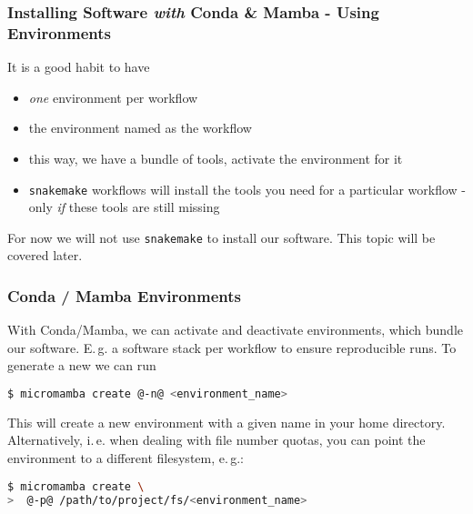 \begin{frame}
  \frametitle{Installing Software \emph{with} Conda \& Mamba - Using Environments}
  \begin{hint}It is a good habit to have
        \begin{itemize}
          \item \emph{one} environment per workflow
          \item the environment named as the workflow
          \item this way, we have a bundle of tools, activate the environment for it
          \item \texttt{snakemake} workflows will install the tools you need for a particular workflow - only \emph{if} these tools are still missing
         \end{itemize}
  \end{hint}
  \begin{hint}[Note]
  	For now we will not use \texttt{snakemake} to install our software. This topic will be covered later.
  \end{hint}
\end{frame}

\begin{frame}[fragile]
  \frametitle{Conda / Mamba Environments}
  With Conda/Mamba, we can activate and deactivate environments, which bundle our software. E.\,g. a software stack per workflow to ensure reproducible runs.
    \pause
  To generate a new we can run
  \begin{lstlisting}[language=Bash, style=Shell]
$ micromamba create @-n@ <environment_name>
  \end{lstlisting}
  This will create a new environment with a given name in your home directory. Alternatively, i.\,e. when dealing with file number quotas, you can point the environment to a different filesystem, e.\,g.:
  \begin{lstlisting}[language=Bash, style=Shell] 
$ micromamba create \
>  @-p@ /path/to/project/fs/<environment_name>
   \end{lstlisting}
\end{frame}

